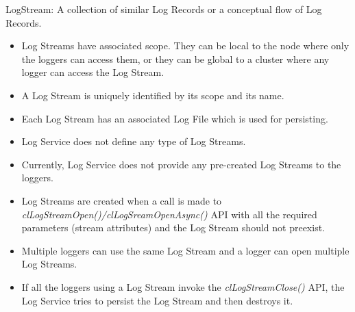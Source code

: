 \begin{flushleft}
\begin{Desc}	
\item 
[LogStream:] A collection of similar Log Records or a conceptual flow of Log Records.
\begin{itemize}
\item	Log Streams have associated scope. They can be local to the node where only the loggers can access them, or they can be global 
to a cluster where any logger can access the Log Stream.
\item	A Log Stream is uniquely identified by its scope and its name.
\item	Each Log Stream has an associated Log File which is used for persisting.
\item	Log Service does not define any type of Log Streams.
\item	Currently, Log Service does not provide any pre-created Log Streams to the loggers.
\item	Log Streams are created when a call is made to \textit{clLogStreamOpen()/clLogSreamOpenAsync()} API with all the required parameters  
(stream attributes) and the Log Stream should not preexist. 
\item	Multiple loggers can use the same Log Stream and a logger can open multiple Log Streams.
\item	If all the loggers using a Log Stream invoke the \textit{clLogStreamClose()} API, the Log Service tries to persist the Log Stream 
and then destroys it.
\end{itemize}
\end{Desc}


\end{flushleft}
